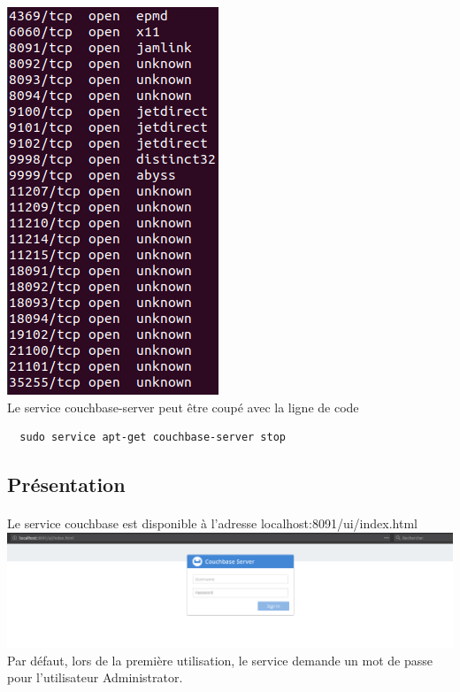 \documentclass{article}
\begin{document}
  \includegraphics[scale=0.8]{couchBase/ports.png}\\
  \newpage
  Le service couchbase-server peut être coupé avec la ligne de code

  \begin{lstlisting}
  sudo service apt-get couchbase-server stop
  \end{lstlisting}

\newpage  
\subsection{Présentation}
  \paragraph{} 
  Le service couchbase est disponible à l’adresse localhost:8091/ui/index.html\\
  
  \includegraphics[scale=0.2]{couchBase/accueil.png}\\
  Par défaut, lors de la première utilisation, le service demande un mot de passe pour l’utilisateur Administrator.\\
 
\end{document}
